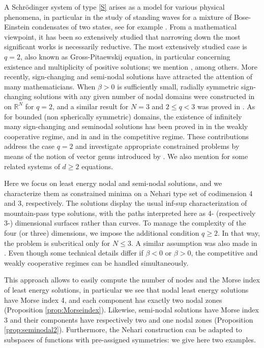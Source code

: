 \documentclass[reqno]{amsart}
\begin{document}
A Schr\"{o}dinger system of type  \eqref{S}  arises as a model for various physical
phenomena, in particular in the study of standing
waves for a mixture of Bose-Einstein condensates of two states, see
for example \cite{BoseEinstein}.
From a mathematical viewpoint, it has been so extensively studied that narrowing down
the most significant works is necessarily reductive.
The most extensively studied case is $q=2$, also known as Gross-Pitaewskij equation,
in particular concerning existence and multiplicity of positive solutions;
we mention \cite{LW_AIHP05,BW_JDE06,MMP_JDE06}, among others.
More recently, sign-changing and semi-nodal solutions have attracted the attention of
many mathematicians. When $\beta >0$ is sufficiently small,  radially symmetric
sign-changing solutions with any given number of nodal domains  were constructed
in \cite{MMP_CCM08} on $\mathbb{R}^N$ for $q=2$, and  a similar result for $N=3$ and $2\le q <3$
was proved in \cite{Z_BVP24}.
As for bounded (non spherically symmetric) domains,  the existence of infinitely many
sign-changing and seminodal solutions has been proved in \cite{CLZ_JDE13}
in the weakly cooperative regime, and in \cite{CLZ_ASNSP16} and \cite{LLW_CV15}
in the competitive regime.
These contributions address the case
$q=2$ and investigate  appropriate constrained problems by means of the notion of
vector genus introduced by \cite{TT_AIHP12}.
We also mention  \cite{SW_DCDS15,CS_CCM23,Song_JDE25} for some related systems
of $d\ge 2$ equations.

Here we focus on least energy nodal and semi-nodal solutions, and we characterize
them as constrained minima on a Nehari type set of codimension 4 and 3, respectively.
The solutions display the usual inf-sup characterization of mountain-pass type solutions,
with the paths interpreted here as 4- (respectively 3-) dimensional surfaces rather
than curves.
To manage the complexity of the four (or three) dimensions, we impose the additional
condition $q\ge2$. In that way, the problem is subcritical only for $N\le 3$.
A similar assumption was also made in \cite{MMP_JDE06, Z_BVP24}.
Even though some technical details differ if $\beta<0$ or $\beta>0$,
the competitive and weakly cooperative regimes can be handled simultaneously.

This approach allows to easily compute the number of nodes and the Morse index
of least energy solutions, in particular we see that nodal least energy solutions have
Morse index 4, and each component has exactly two nodal zones
(Proposition \ref{prop:Morseindex}). Likewise, semi-nodal solutions have Morse index 3
 and their components have respectively two and one nodal zones
 (Proposition \ref{prop:seminodal2}).
Furthermore, the Nehari construction can be adapted to subspaces of functions with
pre-assigned symmetries: we give here two examples.
\end{document}
